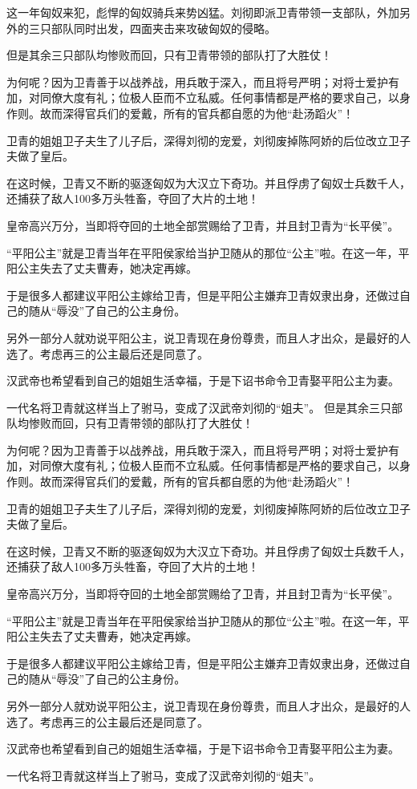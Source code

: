 \documentclass[UTF8,cap,nofonts,openany,twoside]{ctexbook}
\begin{document}
这一年匈奴来犯，彪悍的匈奴骑兵来势凶猛。刘彻即派卫青带领一支部队，外加另外的三只部队同时出发，四面夹击来攻破匈奴的侵略。

但是其余三只部队均惨败而回，只有卫青带领的部队打了大胜仗！

为何呢？因为卫青善于以战养战，用兵敢于深入，而且将号严明；对将士爱护有加，对同僚大度有礼；位极人臣而不立私威。任何事情都是严格的要求自己，以身作则。故而深得官兵们的爱戴，所有的官兵都自愿的为他“赴汤蹈火”！

卫青的姐姐卫子夫生了儿子后，深得刘彻的宠爱，刘彻废掉陈阿娇的后位改立卫子夫做了皇后。

在这时候，卫青又不断的驱逐匈奴为大汉立下奇功。并且俘虏了匈奴士兵数千人，还捕获了敌人100多万头牲畜，夺回了大片的土地！

皇帝高兴万分，当即将夺回的土地全部赏赐给了卫青，并且封卫青为“长平侯”。

“平阳公主”就是卫青当年在平阳侯家给当护卫随从的那位“公主”啦。在这一年，平阳公主失去了丈夫曹寿，她决定再嫁。

于是很多人都建议平阳公主嫁给卫青，但是平阳公主嫌弃卫青奴隶出身，还做过自己的随从“辱没”了自己的公主身份。

另外一部分人就劝说平阳公主，说卫青现在身份尊贵，而且人才出众，是最好的人选了。考虑再三的公主最后还是同意了。

汉武帝也希望看到自己的姐姐生活幸福，于是下诏书命令卫青娶平阳公主为妻。

一代名将卫青就这样当上了驸马，变成了汉武帝刘彻的“姐夫”。
\newpage
但是其余三只部队均惨败而回，只有卫青带领的部队打了大胜仗！

为何呢？因为卫青善于以战养战，用兵敢于深入，而且将号严明；对将士爱护有加，对同僚大度有礼；位极人臣而不立私威。任何事情都是严格的要求自己，以身作则。故而深得官兵们的爱戴，所有的官兵都自愿的为他“赴汤蹈火”！

卫青的姐姐卫子夫生了儿子后，深得刘彻的宠爱，刘彻废掉陈阿娇的后位改立卫子夫做了皇后。

在这时候，卫青又不断的驱逐匈奴为大汉立下奇功。并且俘虏了匈奴士兵数千人，还捕获了敌人100多万头牲畜，夺回了大片的土地！

皇帝高兴万分，当即将夺回的土地全部赏赐给了卫青，并且封卫青为“长平侯”。

“平阳公主”就是卫青当年在平阳侯家给当护卫随从的那位“公主”啦。在这一年，平阳公主失去了丈夫曹寿，她决定再嫁。

于是很多人都建议平阳公主嫁给卫青，但是平阳公主嫌弃卫青奴隶出身，还做过自己的随从“辱没”了自己的公主身份。

另外一部分人就劝说平阳公主，说卫青现在身份尊贵，而且人才出众，是最好的人选了。考虑再三的公主最后还是同意了。

汉武帝也希望看到自己的姐姐生活幸福，于是下诏书命令卫青娶平阳公主为妻。

一代名将卫青就这样当上了驸马，变成了汉武帝刘彻的“姐夫”。
\end{document}
